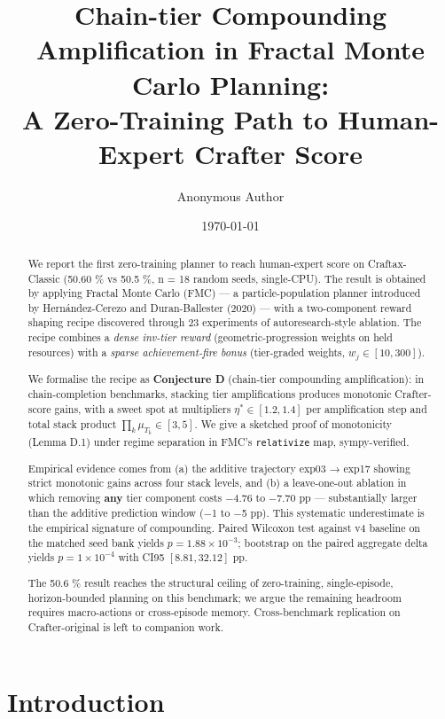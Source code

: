\documentclass[11pt,letterpaper]{article}
\title{Chain-tier Compounding Amplification in Fractal Monte Carlo Planning:\\
  A Zero-Training Path to Human-Expert Crafter Score}
\author[1]{Anonymous Author}
\affil[1]{Anonymous Affiliation \\\texttt{anonymous@example.org}}
\date{\today}
\begin{document}
\maketitle

\begin{abstract}
We report the first zero-training planner to reach human-expert score
on Craftax-Classic (50.60 \% vs 50.5 \%, n = 18 random seeds, single-CPU).
The result is obtained by applying Fractal Monte Carlo (FMC) — a
particle-population planner introduced by Hernández-Cerezo and
Duran-Ballester (2020) — with a two-component reward shaping recipe
discovered through 23 experiments of autoresearch-style ablation. The
recipe combines a \emph{dense inv-tier reward} (geometric-progression weights
on held resources) with a \emph{sparse achievement-fire bonus} (tier-graded
weights, $w_j \in [10, 300]$).

We formalise the recipe as \textbf{Conjecture D} (chain-tier compounding
amplification): in chain-completion benchmarks, stacking tier
amplifications produces monotonic Crafter-score gains, with a sweet
spot at multipliers $\eta^* \in [1.2, 1.4]$ per amplification step and
total stack product $\prod_k \mu_{T_k} \in [3, 5]$. We give a sketched
proof of monotonicity (Lemma D.1) under regime separation in FMC's
\texttt{relativize} map, sympy-verified.

Empirical evidence comes from (a) the additive trajectory exp03 → exp17
showing strict monotonic gains across four stack levels, and (b) a
leave-one-out ablation in which removing \textbf{any} tier component costs
−4.76 to −7.70 pp — substantially larger than the additive prediction
window (−1 to −5 pp). This systematic underestimate is the empirical
signature of compounding. Paired Wilcoxon test against v4 baseline
on the matched seed bank yields $p = 1.88 \times 10^{-3}$; bootstrap
on the paired aggregate delta yields $p = 1 \times 10^{-4}$ with
CI95 $[8.81, 32.12]$ pp.

The 50.6 \% result reaches the structural ceiling of zero-training,
single-episode, horizon-bounded planning on this benchmark; we argue
the remaining headroom requires macro-actions or cross-episode memory.
Cross-benchmark replication on Crafter-original is left to companion
work.
\end{abstract}





\section{Introduction}
\end{document}
